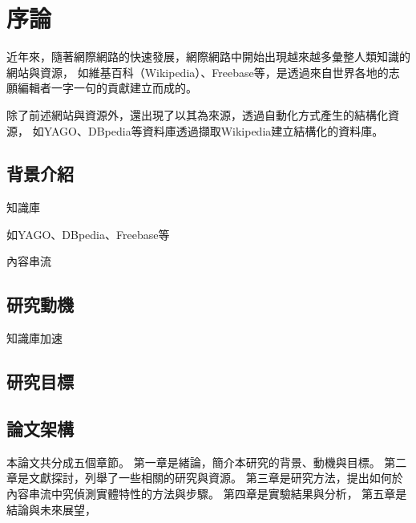 \chapter{序論}
\label{c:intro}

近年來，隨著網際網路的快速發展，網際網路中開始出現越來越多彙整人類知識的網站與資源，
如維基百科（Wikipedia）、Freebase等，是透過來自世界各地的志願編輯者一字一句的貢獻建立而成的。


除了前述網站與資源外，還出現了以其為來源，透過自動化方式產生的結構化資源，
如YAGO、DBpedia等資料庫透過擷取Wikipedia建立結構化的資料庫。


\section{背景介紹}

知識庫

如YAGO、DBpedia、Freebase等

內容串流


\section{研究動機}
知識庫加速

\section{研究目標}

\section{論文架構}  %
本論文共分成五個章節。
第一章是緒論，簡介本研究的背景、動機與目標。
第二章是文獻探討，列舉了一些相關的研究與資源。
第三章是研究方法，提出如何於內容串流中究偵測實體特性的方法與步驟。
第四章是實驗結果與分析，
第五章是結論與未來展望，


%
%

